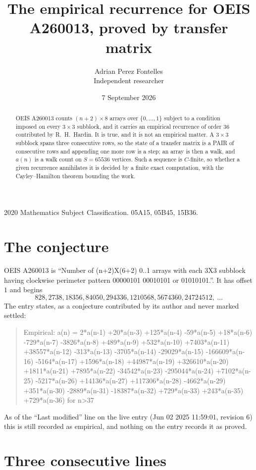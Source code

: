 \documentclass[11pt,a4paper]{article}
\title{The empirical recurrence for OEIS A260013, proved by transfer matrix}
\author{Adrian Perez Fontelles\\ \small Independent researcher}
\date{7 September 2026}
\theoremstyle{plain}
\theoremstyle{definition}
\begin{document}
\maketitle

\begin{abstract}
OEIS A260013 counts $(n+2)\times8$ arrays over $\{0,\dots,1\}$ subject to a condition imposed on
every $3\times3$ subblock, and it carries an empirical recurrence of order $36$
contributed by R.~H.~Hardin. It is true, and it is not an empirical matter. A $3\times3$
subblock spans three consecutive rows, so the state of a transfer matrix is a PAIR of
consecutive rows and appending one more row is a step; an array is then a walk, and
$a(n)$ is a walk count on $S=65536$ vertices. Such a sequence is $C$-finite, so whether a given
recurrence annihilates it is decided by a finite exact computation, with the Cayley--Hamilton
theorem bounding the work.
\end{abstract}

\noindent\small 2020 Mathematics Subject Classification. 05A15, 05B45, 15B36.\normalsize

\section{The conjecture}

OEIS A260013 is ``Number of (n+2)X(6+2) 0..1 arrays with each 3X3 subblock having clockwise perimeter pattern 00000101 00010101 or 01010101.''. It has offset $1$ and begins
\[
828, 2738, 18356, 84050, 294336, 1210568, 5674360, 24724512,\ \dots
\]
The entry states, as a conjecture contributed by its author and never marked settled:
\begin{quote}
Empirical: a(n) = 2*a(n-1) +20*a(n-3) +125*a(n-4) -59*a(n-5) +18*a(n-6) -729*a(n-7) -3826*a(n-8) +489*a(n-9) +532*a(n-10) +7403*a(n-11) +38557*a(n-12) -313*a(n-13) -3705*a(n-14) -29029*a(n-15) -166609*a(n-16) -5164*a(n-17) +1596*a(n-18) +44987*a(n-19) +326610*a(n-20) +1811*a(n-21) +7895*a(n-22) -34542*a(n-23) -295044*a(n-24) +7102*a(n-25) -5217*a(n-26) +14136*a(n-27) +117306*a(n-28) -4662*a(n-29) +351*a(n-30) -2889*a(n-31) -18387*a(n-32) +729*a(n-33) +243*a(n-35) +729*a(n-36) for n>37
\end{quote}
As of the ``Last modified'' line on the live entry (Jun 02 2025 11:59:01, revision 6) this is still
recorded as empirical, and nothing on the entry records it as proved.

\section{Three consecutive lines}
\end{document}
